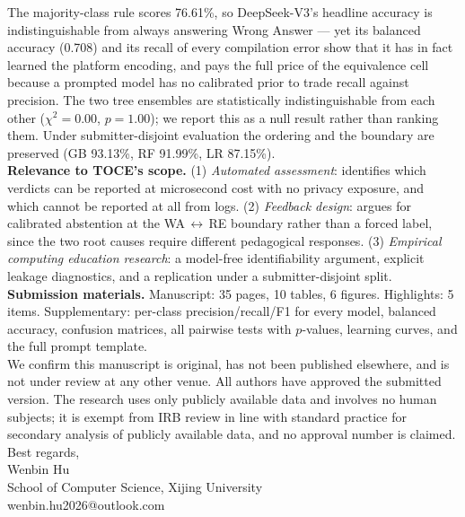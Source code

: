 \documentclass[11pt]{article}
\begin{document}
\noindent The majority-class rule scores 76.61\%, so DeepSeek-V3's headline accuracy is indistinguishable from always answering Wrong Answer --- yet its balanced accuracy (0.708) and its recall of every compilation error show that it has in fact learned the platform encoding, and pays the full price of the equivalence cell because a prompted model has no calibrated prior to trade recall against precision. The two tree ensembles are statistically indistinguishable from each other ($\chi^2=0.00$, $p=1.00$); we report this as a null result rather than ranking them. Under submitter-disjoint evaluation the ordering and the boundary are preserved (GB 93.13\%, RF 91.99\%, LR 87.15\%).\\[1ex]

\noindent\textbf{Relevance to TOCE's scope.} (1) \emph{Automated assessment}: identifies which verdicts can be reported at microsecond cost with no privacy exposure, and which cannot be reported at all from logs. (2) \emph{Feedback design}: argues for calibrated abstention at the WA\,$\leftrightarrow$\,RE boundary rather than a forced label, since the two root causes require different pedagogical responses. (3) \emph{Empirical computing education research}: a model-free identifiability argument, explicit leakage diagnostics, and a replication under a submitter-disjoint split.\\[1ex]

\noindent\textbf{Submission materials.} Manuscript: 35 pages, 10 tables, 6 figures. Highlights: 5 items. Supplementary: per-class precision/recall/F1 for every model, balanced accuracy, confusion matrices, all pairwise tests with $p$-values, learning curves, and the full prompt template.\\[1ex]

We confirm this manuscript is original, has not been published elsewhere, and is not under review at any other venue. All authors have approved the submitted version. The research uses only publicly available data and involves no human subjects; it is exempt from IRB review in line with standard practice for secondary analysis of publicly available data, and no approval number is claimed.\\[2ex]

Best regards,\\[2ex]

Wenbin Hu\\
School of Computer Science, Xijing University\\
wenbin.hu2026@outlook.com
\end{document}
